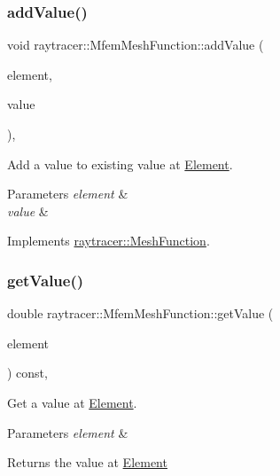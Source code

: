 \subsubsection{\texorpdfstring{add\+Value()}{addValue()}}
{\footnotesize\ttfamily void raytracer\+::\+Mfem\+Mesh\+Function\+::add\+Value (\begin{DoxyParamCaption}\item[{const \hyperlink{classraytracer_1_1Element}{Element} \&}]{element,  }\item[{double}]{value }\end{DoxyParamCaption})\hspace{0.3cm}{\ttfamily [override]}, {\ttfamily [virtual]}}



Add a value to existing value at \hyperlink{classraytracer_1_1Element}{Element}. 


\begin{DoxyParams}{Parameters}
{\em element} & \\
\hline
{\em value} & \\
\hline
\end{DoxyParams}


Implements \hyperlink{classraytracer_1_1MeshFunction_a134b7ca4400d04030a67cadd691ee879}{raytracer\+::\+Mesh\+Function}.

\mbox{\label{classraytracer_1_1MfemMeshFunction_a3e7183c2cca55df6115176d1d9030846}} 
\subsubsection{\texorpdfstring{get\+Value()}{getValue()}}
{\footnotesize\ttfamily double raytracer\+::\+Mfem\+Mesh\+Function\+::get\+Value (\begin{DoxyParamCaption}\item[{const \hyperlink{classraytracer_1_1Element}{Element} \&}]{element }\end{DoxyParamCaption}) const\hspace{0.3cm}{\ttfamily [override]}, {\ttfamily [virtual]}}



Get a value at \hyperlink{classraytracer_1_1Element}{Element}. 


\begin{DoxyParams}{Parameters}
{\em element} & \\
\hline
\end{DoxyParams}
\begin{DoxyReturn}{Returns}
the value at \hyperlink{classraytracer_1_1Element}{Element} 
\end{DoxyReturn}


